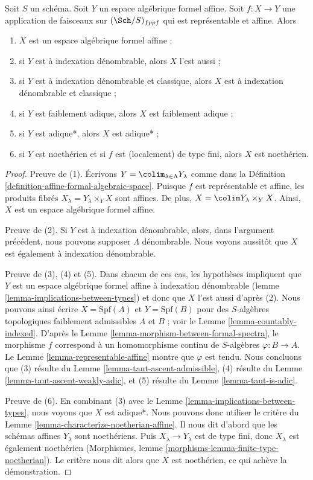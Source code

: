 \begin{lemma}
\label{lemma-property-goes-up-affine-morphism}
Soit $S$ un schéma. Soit $Y$ un espace algébrique formel affine.
Soit $f : X \to Y$ une application de faisceaux sur $(\Sch/S)_{fppf}$ qui
est représentable et affine. Alors
\begin{enumerate}
\item $X$ est un espace algébrique formel affine ;
\item si $Y$ est à indexation dénombrable, alors $X$ l'est aussi ;
\item si $Y$ est à indexation dénombrable et classique, alors $X$ est
à indexation dénombrable et classique ;
\item si $Y$ est faiblement adique, alors $X$ est faiblement adique ;
\item si $Y$ est adique*, alors $X$ est adique* ;
\item si $Y$ est noethérien et si $f$ est (localement) de type fini, alors
$X$ est noethérien.
\end{enumerate}
\end{lemma}

\begin{proof}
Preuve de (1). Écrivons $Y = \colim_{\lambda \in \Lambda} Y_\lambda$ comme dans la
Définition \ref{definition-affine-formal-algebraic-space}.
Puisque $f$ est représentable et affine, les produits fibrés
$X_\lambda = Y_\lambda \times_Y X$ sont affines. De plus,
$X = \colim Y_\lambda \times_Y X$.
Ainsi, $X$ est un espace algébrique formel affine.

\medskip\noindent
Preuve de (2). Si $Y$ est à indexation dénombrable, alors, dans l'argument précédent,
nous pouvons supposer $\Lambda$ dénombrable.
Nous voyons aussitôt que $X$ est également à indexation dénombrable.

\medskip\noindent
Preuve de (3), (4) et (5). Dans chacun de ces cas, les hypothèses impliquent
que $Y$ est un espace algébrique formel affine à indexation dénombrable
(lemme \ref{lemma-implications-between-types})
et donc que $X$ l'est aussi d'après (2). Nous pouvons ainsi écrire $X = \text{Spf}(A)$
et $Y = \text{Spf}(B)$ pour des $S$-algèbres topologiques faiblement
admissibles $A$ et $B$ ; voir le Lemme \ref{lemma-countably-indexed}.
D'après le Lemme \ref{lemma-morphism-between-formal-spectra},
le morphisme $f$ correspond à un homomorphisme continu de $S$-algèbres
$\varphi : B \to A$. Le
Lemme \ref{lemma-representable-affine} montre que $\varphi$ est tendu. Nous concluons que
(3) résulte du Lemme \ref{lemma-taut-ascent-admissible},
(4) résulte du Lemme \ref{lemma-taut-ascent-weakly-adic}, et
(5) résulte du Lemme \ref{lemma-taut-is-adic}.

\medskip\noindent
Preuve de (6). En combinant (3) avec le Lemme \ref{lemma-implications-between-types},
nous voyons que $X$ est adique*. Nous pouvons donc utiliser le critère du
Lemme \ref{lemma-characterize-noetherian-affine}.
Il nous dit d'abord que les schémas affines $Y_\lambda$ sont noethériens.
Puis $X_\lambda \to Y_\lambda$ est de type fini, donc $X_\lambda$
est également noethérien (Morphismes, lemme
\ref{morphisms-lemma-finite-type-noetherian}).
Le critère nous dit alors que $X$ est noethérien, ce qui achève la
démonstration.
\end{proof}

